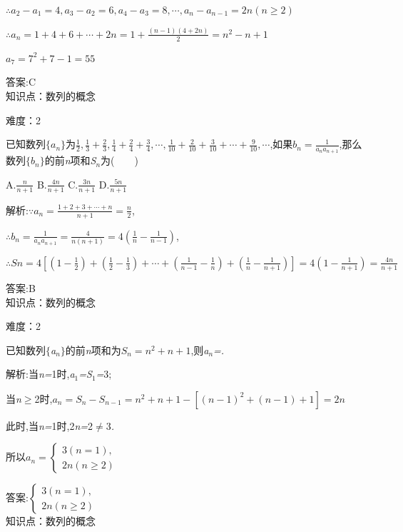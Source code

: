 \documentclass{article} %
\begin{document}
$\therefore a_2-a_1=4, a_3-a_2=6, a_4-a_3=8,\cdots, a_n-a_{n-1}=2n(n\ge 2)$

$\therefore a_n=1+4+6+\cdots+2n=1+\frac{(n-1)(4+2n)}{2}=n^2-n+1$

$a_7=7^2+7-1=55$

 答案:C \\

知识点：数列的概念

难度：2

 已知数列$\{a_n\}$为$\frac{1}{2},\frac{1}{3}+\frac{2}{3},\frac{1}{4}+\frac{2}{4}+\frac{3}{4},\cdots,\frac{1}{10}+\frac{2}{10}+\frac{3}{10}+\cdots+\frac{9}{10},\cdots$,如果$b_n=\frac{1}{a_na_{n+1}}$,那么数列$\{b_n\}$的前\textit{n}项和\textit{S${}_{n}$}为(\textit{　　})

 A.$\frac{n}{n+1}$ B.$\frac{4n}{n+1}$ C.$\frac{3n}{n+1}$ D.$\frac{5n}{n+1}$

 解析:$\because a_n=\frac{1+2+3+\cdots+n}{n+1}=\frac{n}{2}$,

$\therefore b_n=\frac{1}{a_na_{n+1}}=\frac{4}{n(n+1)}=4(\frac{1}{n}-\frac{1}{n-1})$,

$\therefore Sn=4[(1-\frac{1}{2})+(\frac{1}{2}-\frac{1}{3})+\cdots+(\frac{1}{n-1}-\frac{1}{n})+(\frac{1}{n}-\frac{1}{n+1})]=4(1-\frac{1}{n+1})=\frac{4n}{n+1}$

 答案:B \\

知识点：数列的概念

难度：2

 已知数列$\mathrm{\{}$\textit{a${}_{n}$}$\mathrm{\}}$的前\textit{n}项和为$S_n=n^2+n+1$,则\textit{a${}_{n}$=\underbar{　　　　　　　　　　}.~}

 解析:当\textit{n=}1时,\textit{a}${}_{1}$\textit{=S}${}_{1}$\textit{=}3;

当\textit{n}$\mathrm{\ge}$2时,$a_n=S_n-S_{n-1}=n^2+n+1-[(n-1)^2+(n-1)+1]=2n$

此时,当\textit{n=}1时,2\textit{n=}2$\mathrm{\neq}$3\textit{.}

所以$a_n=\left\{
\begin{array}{l}
3(n=1), \\
2n(n\ge 2)
\end{array}
\right.$

 答案:$\left\{
\begin{array}{l}
3(n=1), \\
2n(n\ge 2)
\end{array}
\right.$ \\

知识点：数列的概念
\end{document}
